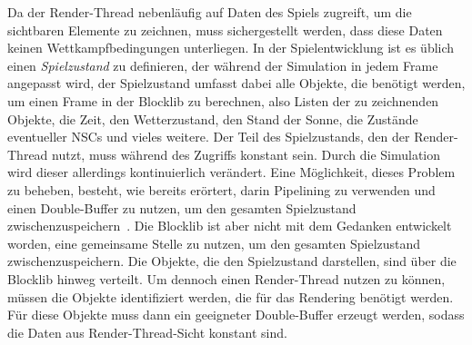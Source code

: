 Da der Render-Thread nebenläufig auf Daten des Spiels zugreift, um die sichtbaren Elemente zu zeichnen, muss sichergestellt werden, dass diese Daten keinen Wettkampfbedingungen unterliegen. In der Spielentwicklung ist es üblich einen \emph{Spielzustand} zu definieren, der während der Simulation in jedem Frame angepasst wird, der Spielzustand umfasst dabei alle Objekte, die benötigt werden, um einen Frame in der Blocklib zu berechnen, also Listen der zu zeichnenden Objekte, die Zeit, den Wetterzustand, den Stand der Sonne, die Zustände eventueller NSCs und vieles weitere. Der Teil des Spielzustands, den der Render-Thread nutzt, muss während des Zugriffs konstant sein. Durch die Simulation wird dieser allerdings kontinuierlich verändert. Eine Möglichkeit, dieses Problem zu beheben, besteht, wie bereits erörtert, darin Pipelining zu verwenden und einen Double-Buffer zu nutzen, um den gesamten Spielzustand zwischenzuspeichern~\cite{Tatarchuk2014}. Die Blocklib ist aber nicht mit dem Gedanken entwickelt worden, eine gemeinsame Stelle zu nutzen, um den gesamten Spielzustand zwischenzuspeichern. Die Objekte, die den Spielzustand darstellen, sind über die Blocklib hinweg verteilt. Um dennoch einen Render-Thread nutzen zu können, müssen die Objekte identifiziert werden, die für das Rendering benötigt werden. Für diese Objekte muss dann ein geeigneter Double-Buffer erzeugt werden, sodass die Daten aus Render-Thread-Sicht konstant sind.

